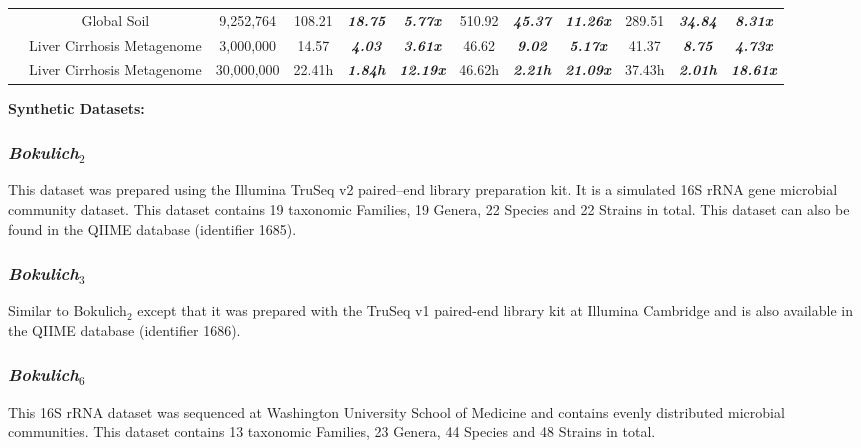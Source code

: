 \documentclass[10pt, conference, compsocconf]{IEEEtran}
\begin{document}
\begin{table}
{\begin{tabular}{|c c c|c c c|c c c|c c c|}
			& Global Soil & 9,252,764 & 108.21 &  \textit{\textbf{18.75}} & \textit{\textbf{5.77x}} & 510.92 & \textit{\textbf{45.37}} & \textit{\textbf{11.26x}} & 289.51 &  \textit{\textbf{34.84}} & \textit{\textbf{8.31x}}\\
			
			& Liver Cirrhosis Metagenome & 3,000,000 & 14.57 &  \textit{\textbf{4.03}} & \textit{\textbf{3.61x}} & 46.62 & \textit{\textbf{9.02}} & \textit{\textbf{5.17x}} & 41.37 &  \textit{\textbf{8.75}} & \textit{\textbf{4.73x}}\\
			
			& Liver Cirrhosis Metagenome & 30,000,000 & 22.41h &  \textit{\textbf{1.84h}} & \textit{\textbf{12.19x}} & 46.62h & \textit{\textbf{2.21h}} & \textit{\textbf{21.09x}} & 37.43h &  \textit{\textbf{2.01h}} & \textit{\textbf{18.61x}}\\		
			
			\hline 
			
		\end{tabular}
	}
\end{table} 

\textbf{Synthetic Datasets:}

\subsubsection{\textit{Bokulich$_2$}}
This dataset was prepared using the 
Illumina TruSeq v2 paired--end library
preparation kit. It is a simulated 16S rRNA gene 
microbial community dataset.
This 
dataset contains 19 taxonomic Families, 19 Genera, 22 Species 
and 22 Strains in total. This dataset can also be 
found in the QIIME database (identifier 1685).

\subsubsection{\textit{Bokulich$_3$}}
Similar to Bokulich$_2$ except that it was 
prepared with the 
TruSeq v1 paired-end library kit at 
Illumina Cambridge and is  also available in the 
QIIME database (identifier 1686).

\subsubsection{\textit{Bokulich$_6$}}
This  16S rRNA dataset 
was sequenced at Washington University School of Medicine and contains evenly distributed microbial communities. This dataset contains 13 taxonomic Families, 23 Genera, 44 Species and 48 Strains in total.
\end{document}
